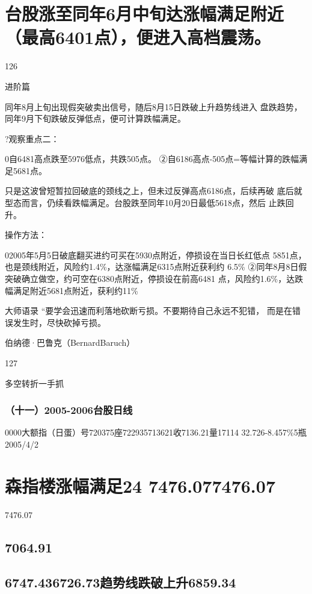 \documentclass{article}
\begin{document}
\section{台股涨至同年6月中旬达涨幅满足附近（最高6401点），便进入高档震荡。}

126

\clearpage

进阶篇

同年8月上旬出现假突破卖出信号，随后8月15日跌破上升趋势线进入 盘跌趋势，同年9月下旬跌破反弹低点，便可计算跌幅满足。

?观察重点二：

0自6481高点跌至5976低点，共跌505点。 ②自6186高点-505点=等幅计算的跌幅满足5681点。

只是这波曾短暂拉回破底的颈线之上，但未过反弹高点6186点，后续再破 底后就型态而言，仍续看跌幅满足。台股跌至同年10月20日最低5618点，然后 止跌回升。

操作方法：

02005年5月5日破底翻买进约可买在5930点附近，停损设在当日长红低点 5851点，也是颈线附近，风险约1.4\%，达涨幅满足6315点附近获利约 6.5\% ②同年8月8日假突破确立做空，约可空在6380点附近，停损设在前高6481 点，风险约1.6\%，达跌幅满足附近5681点附近，获利约11\%

大师语录 “要学会迅速而利落地砍断亏损。不要期待自己永远不犯错， 而是在错误发生时，尽快砍掉亏损。

伯纳德·巴鲁克（BernardBaruch）

127

\clearpage

多空转折一手抓

\subsubsection{（十一）2005-2006台股日线}

0000大额指（日蛋）号720375座722935713621收7136.21量17114 32.726-8.457\%5瓶2005/4/2

\section{森指楼涨幅满足24 7476.077476.07}

7476.07

\subsection{7064.91}

\subsection{6747.436726.73趋势线跌破上升6859.34}
\end{document}
